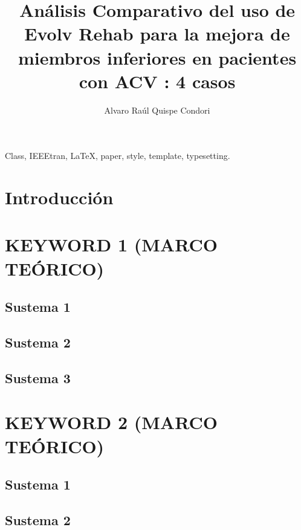 \documentclass[journal]{IEEEtran}
\begin{document}
\title{Análisis Comparativo del uso de Evolv Rehab para la mejora de miembros inferiores en pacientes con ACV : 4 casos}
\author{Alvaro Raúl Quispe Condori}


\maketitle

\begin{abstract}
   
   
   
   
\end{abstract}

\begin{IEEEkeywords}
Class, IEEEtran, \LaTeX, paper, style, template, typesetting.
\end{IEEEkeywords}


\section{Introducción}
\section{KEYWORD 1 (MARCO TEÓRICO)}
\subsection{Sustema 1}
\subsection{Sustema 2}
\subsection{Sustema 3}

\section{KEYWORD 2 (MARCO TEÓRICO)}
\subsection{Sustema 1}
\subsection{Sustema 2}
\end{document}
